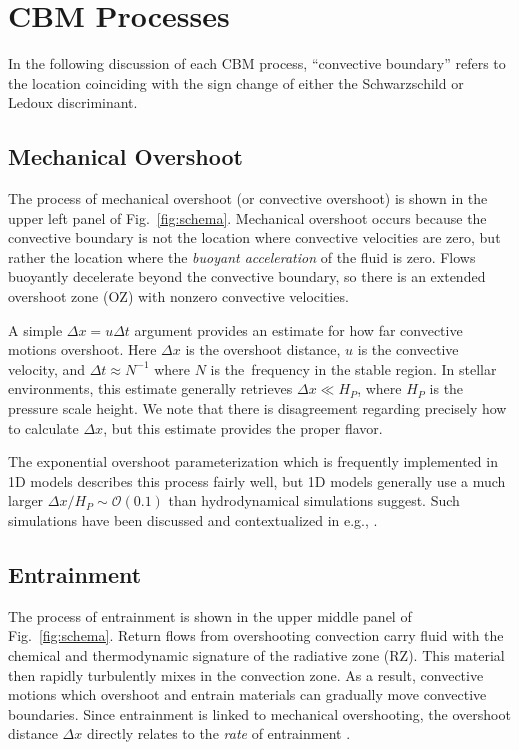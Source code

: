 \section{CBM Processes}
\label{sec:processes}

In the following discussion of each CBM process, ``convective boundary'' refers to the location coinciding with the sign change of either the Schwarzschild or Ledoux discriminant.

\subsection{Mechanical Overshoot}
The process of mechanical overshoot (or convective overshoot) is shown in the upper left panel of Fig.~\ref{fig:schema}.
Mechanical overshoot occurs because the convective boundary is not the location where convective velocities are zero, but rather the location where the \emph{buoyant acceleration} of the fluid is zero.
Flows buoyantly decelerate beyond the convective boundary, so there is an extended overshoot zone (OZ) with nonzero convective velocities.

A simple $\Delta x = u \Delta t$ argument provides an estimate for how far convective motions overshoot.
Here $\Delta x$ is the overshoot distance, $u$ is the convective velocity, and $\Delta t \approx N^{-1}$ where $N$ is the \brunt$\,$frequency in the stable region.
In stellar environments, this estimate generally retrieves $\Delta x \ll H_P$, where $H_P$ is the pressure scale height.
We note that there is disagreement regarding precisely how to calculate $\Delta x$, but this estimate provides the proper flavor.

The exponential overshoot parameterization \citep[per e.g.,][]{herwig_2000} which is frequently implemented in 1D models describes this process fairly well, but 1D models generally use a much larger $\Delta x/H_P \sim \mathcal{O}(0.1)$ than hydrodynamical simulations suggest.
Such simulations have been discussed and contextualized in e.g., \citet{korre_etal_2019}.


\subsection{Entrainment}
The process of entrainment is shown in the upper middle panel of Fig.~\ref{fig:schema}.
Return flows from overshooting convection carry fluid with the chemical and thermodynamic signature of the radiative zone (RZ).
This material then rapidly turbulently mixes in the convection zone.
As a result, convective motions which overshoot and entrain materials can gradually move convective boundaries.
Since entrainment is linked to mechanical overshooting, the overshoot distance $\Delta x$ directly relates to the \emph{rate} of entrainment \citep[which can be inferred from frequently-plotted entrainment rate laws;][]{meakin_arnett_2007}.

